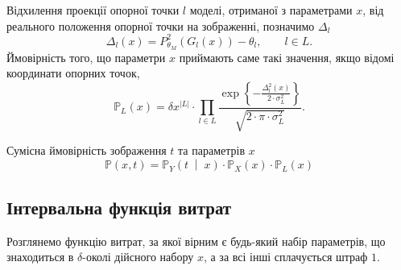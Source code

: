 Відхилення проекції опорної точки $l$ моделі,
отриманої з параметрами $x$,
від реального положення опорної точки на зображенні,
позначимо $\Delta_l$
\begin{equation*}
  \Delta_l\left( x \right)
  = P^2_{\theta_M}\left( G_l\left( x \right) \right) - \theta_l,
  \qquad l \in L.
\end{equation*}
Ймовірність того, що параметри $x$ приймають саме такі значення,
якщо відомі координати опорних точок,
\begin{equation*}
  \mathbb{P}_L\left( x \right)
  = \delta x^{\left| L \right|} \cdot \prod_{l \in L}
      \frac{\exp{\left\{- \frac{\Delta_l^2\left( x \right)}
           {2 \cdot \sigma^2_L} \right\}}}
           {\sqrt{2 \cdot \pi \cdot \sigma^2_L}}.
\end{equation*}

Сумісна ймовірність зображення $t$ та параметрів $x$
\begin{equation*}
  \mathbb{P}\left( x, t \right)
  = \mathbb{P}_Y\left( t \;\middle|\; x \right)
    \cdot \mathbb{P}_X\left( x \right)
    \cdot \mathbb{P}_L\left( x \right)
\end{equation*}

\subsection{Інтервальна функція витрат}

Розглянемо функцію витрат,
за якої вірним є будь-який набір параметрів,
що знаходиться в $\delta$-околі дійсного набору $x$,
а за всі інші сплачується штраф $1$.

